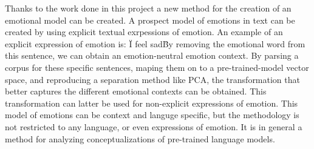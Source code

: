 Thanks to the work done in this project a new method for the creation of an emotional model can be created. A prospect model of emotions in text can be created by using explicit textual exrpessions of emotion. An example of an explicit expression of emotion is: \"I feel sad\" By removing the emotional word from this sentence, we can obtain an emotion-neutral emotion context. By parsing a corpus for these specific sentences, maping them on to a pre-trained-model vector space, and reproducing a separation method like PCA, the transformation that better captures the different emotional contexts can be obtained. This transformation can latter be used for non-explicit expressions of emotion.
This model of emotions can be context and languge specific, but the methodology is not restricted to any language, or even expressions of emotion. It is in general a method for analyzing conceptualizations of pre-trained language models.






